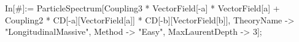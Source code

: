 In[\#]:= ParticleSpectrum[Coupling3 * VectorField[-a] * VectorField[a] + Coupling2 * CD[-a][VectorField[a]] * CD[-b][VectorField[b]], TheoryName -> "LongitudinalMassive", Method -> "Easy", MaxLaurentDepth -> 3]; 